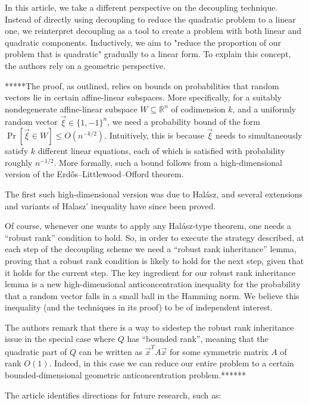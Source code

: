 In this article, we take a different perspective on the decoupling technique. Instead of directly using decoupling to reduce the quadratic problem to a linear one, we reinterpret decoupling as a tool to create a problem with both linear and quadratic components. Inductively, we aim to "reduce the proportion of our problem that is quadratic" gradually to a linear form. To explain this concept, the authors rely on a geometric perspective.
 
*****The proof, as outlined, relies on bounds on probabilities that random vectors lie in certain affine-linear subspaces. More specifically, for a suitably nondegenerate affine-linear subspace $W \subseteq \mathbb{R}^n$ of codimension $k$, and a uniformly random vector $\vec{\xi} \in \{1,-1\}^n$, we need a probability bound of the form $\Pr[\vec{\xi} \in W] \leq O(n^{-k/2})$. Intuitively, this is because $\vec{\xi}$ needs to simultaneously satisfy $k$ different linear equations, each of which is satisfied with probability roughly $n^{-1/2}$. More formally, such a bound follows from a high-dimensional version of the Erdős–Littlewood–Offord theorem.
 
The first such high-dimensional version was due to Halász, and several extensions and variants of Halasz’ inequality have since been proved.
 
Of course, whenever one wants to apply any Halász-type theorem, one needs a “robust rank” condition to hold. So, in order to execute the strategy described, at each step of the decoupling scheme we need a “robust rank inheritance” lemma, proving that a robust rank condition is likely to hold for the next step, given that it holds for the current step. The key ingredient for our robust rank inheritance lemma is a new high-dimensional anticoncentration inequality for the probability that a random vector falls in a small ball in the Hamming norm. We believe this inequality (and the techniques in its proof) to be of independent interest.
 
The authors remark that there is a way to sidestep the robust rank inheritance issue in the special case where $Q$ has “bounded rank”, meaning that the quadratic part of $Q$ can be written as $\vec{x}^T A \vec{x}$ for some symmetric matrix $A$ of rank $O(1)$. Indeed, in this case we can reduce our entire problem to a certain bounded-dimensional geometric anticoncentration problem.******
 
\vspace{\baselineskip}
The article identifies directions for future research, such as:
 
